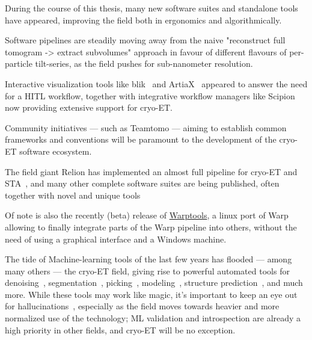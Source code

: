 During the course of this thesis, many new software suites and standalone tools have appeared, improving the field both in ergonomics and algorithmically.

Software pipelines are steadily moving away from the naive "reconstruct full tomogram -> extract subvolumes" approach in favour of different flavours of per-particle tilt-series, as the field pushes for sub-nanometer resolution.

Interactive visualization tools like blik~\cite{gaifasBlikExtensible3D2024} and ArtiaX~\cite{ermelArtiaXElectronTomography2022} appeared to answer the need for a HITL workflow, together with integrative workflow managers like Scipion~\cite{delarosa-trevinScipionSoftwareFramework2016} now providing extensive support for cryo-ET.

Community initiatives --- such as Teamtomo --- aiming to establish common frameworks and conventions will be paramount to the development of the cryo-ET software ecosystem.

The field giant Relion has implemented an almost full pipeline for cryo-ET and STA~\cite{zivanovBayesianApproachSingleparticle2022,burtImageProcessingPipeline2024}, and many other complete software suites are being published, often together with novel and unique tools~\cite{balyschewStreamlinedStructureDetermination2023,galaz-montoyaSingleParticleTomography2015,galaz-montoyaAlignmentAlgorithmsPerparticle2016,himesEmClaritySoftwareHighresolution2018,liuNextPYPComprehensiveScalable2023}

Of note is also the recently (beta) release of \href{https://github.com/warpem/warp}{Warptools}, a linux port of Warp~\cite{tegunovRealtimeCryoelectronMicroscopy2019} allowing to finally integrate parts of the Warp pipeline into others, without the need of using a graphical interface and a Windows machine.

The tide of Machine-learning tools of the last few years has flooded --- among many others --- the cryo-ET field, giving rise to powerful automated tools for denoising~\cite{beplerTopazDenoiseGeneralDeep2020}, segmentation~\cite{lammMemBrainV2Endtoend2024,eisensteinSmartParallelAutomated2024}, picking~\cite{wagnerEvolutionSPHIREcrYOLOParticle2020,riceTomoTwinGeneralized3D2023}, modeling~\cite{jamaliAutomatedModelBuilding2024}, structure prediction~\cite{jumperHighlyAccurateProtein2021,abramsonAccurateStructurePrediction2024,baekAccuratePredictionProtein2021}, and much more.
While these tools may work like magic, it's important to keep an eye out for hallucinations~\cite{maynezFaithfulnessFactualityAbstractive2020}, especially as the field moves towards heavier and more normalized use of the technology; ML validation and introspection are already a high priority in other fields, and cryo-ET will be no exception.

